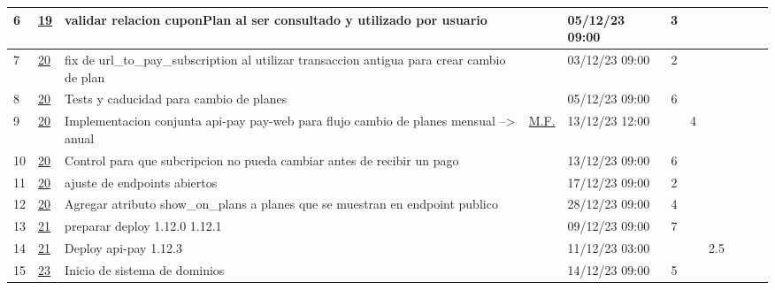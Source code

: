 \documentclass{article}
\begin{document}
\begin{longtable}{|m{0.5cm}|m{1.2cm}|p{5cm}|m{1.5cm}|m{1.5cm}||c|c|c|c|c|c|    |}
                 \label{6}6  &  \hyperref[19]{\color{blue}19}  & validar relacion cuponPlan al ser consultado y utilizado por usuario &  
                 & 05/12/23 09:00  & 3 &  &  &  &  & \\ \hline 

                 \label{7}7  &  \hyperref[20]{\color{blue}20}  & fix de url\_to\_pay\_subscription al utilizar transaccion antigua para crear cambio de plan &  
                 & 03/12/23 09:00  & 2 &  &  &  &  & \\ \hline 

                 \label{8}8  &  \hyperref[20]{\color{blue}20}  & Tests y caducidad para cambio de planes &  
                 & 05/12/23 09:00  & 6 &  &  &  &  & \\ \hline 

                 \label{9}9  &  \hyperref[20]{\color{blue}20}  & Implementacion conjunta api-pay pay-web para flujo cambio de planes mensual --> anual &  
                  \hyperref[M.F.]{\color{blue}M.F.}  & 13/12/23 12:00  &  & 4 &  &  &  & \\ \hline 

                 \label{10}10  &  \hyperref[20]{\color{blue}20}  & Control para que subcripcion no pueda cambiar antes de recibir un pago &  
                 & 13/12/23 09:00  & 6 &  &  &  &  & \\ \hline 

                 \label{11}11  &  \hyperref[20]{\color{blue}20}  & ajuste de endpoints abiertos &  
                 & 17/12/23 09:00  & 2 &  &  &  &  & \\ \hline 

                 \label{12}12  &  \hyperref[20]{\color{blue}20}  & Agregar atributo show\_on\_plans a planes que se muestran en endpoint publico &  
                 & 28/12/23 09:00  & 4 &  &  &  &  & \\ \hline 

                 \label{13}13  &  \hyperref[21]{\color{blue}21}  & preparar deploy 1.12.0 1.12.1 &  
                 & 09/12/23 09:00  & 7 &  &  &  &  & \\ \hline 

                 \label{14}14  &  \hyperref[21]{\color{blue}21}  & Deploy api-pay 1.12.3 &  
                 & 11/12/23 03:00  &  &  & 2.5 &  &  & \\ \hline 

                 \label{15}15  &  \hyperref[23]{\color{blue}23}  & Inicio de sistema de dominios &  
                 & 14/12/23 09:00  & 5 &  &  &  &  & \\ \hline 


\end{longtable}
\end{document}
